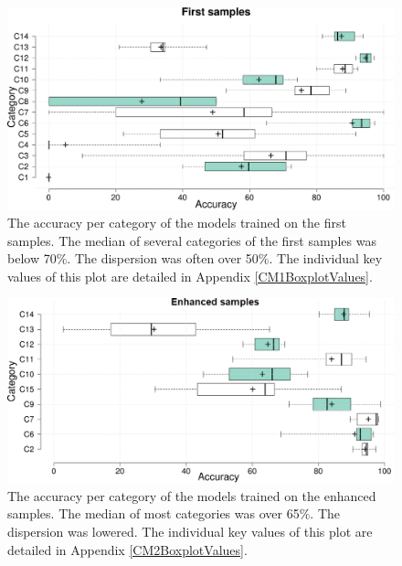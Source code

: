 \FloatBarrier

 \begin{figure}[]
    \centering
    \label{CM1Boxplot}
    \includegraphics[width =\textwidth]{Images/CM1Boxplot.png}
    \caption{The accuracy per category of the models trained on the first samples. The median of several categories of the first samples was below 70\%. The dispersion was often over 50\%. The individual key values of this plot are detailed in Appendix \ref{CM1BoxplotValues}.}
    \label{CM1Boxplot}
\end{figure}


 \begin{figure}[]
    \centering
    \includegraphics[width =\textwidth]{Images/CM2Boxplot.png}
    \caption{The accuracy per category of the models trained on the enhanced samples. The median of most categories was over 65\%. The dispersion was lowered. The individual key values of this plot are detailed in Appendix \ref{CM2BoxplotValues}.}
    \label{CM2Boxplot}
\end{figure}

